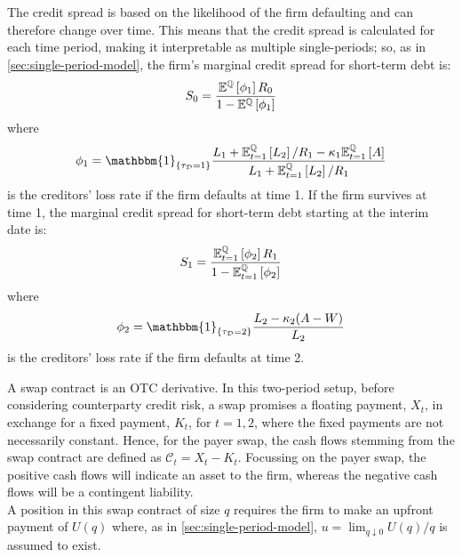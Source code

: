 \documentclass[main.tex]{subfiles}
\begin{document}
        The credit spread is based on the likelihood of the firm defaulting and can therefore change over time.
        This means that the credit spread is calculated for each time period, making it interpretable as multiple single-periods;
        so, as in \cref{sec:single-period-model}, the firm's marginal credit spread for short-term debt is:
        \begin{equation}
            S_0 =
            \frac{
                \mathbb{E}^{\mathbb{Q}}\left[\phi_1\right]R_0
            }{
                1 - \mathbb{E}^{\mathbb{Q}}\left[\phi_1\right] 
            }
        \end{equation}
        where
        \begin{equation}
        \phi_1 = \mathbbm{1}_{\{\tau_{\mathcal{D}}=1\}}
        \frac{L_{1}+\mathbb{E}_{t=1}^{\rnmeasure}\left[L_{2}\right]/R_1 - \kappa_{1}\mathbb{E}_{t=1}^{\rnmeasure}\left[A\right]}
        {L_{1} + \mathbb{E}_{t=1}^{\rnmeasure}\left[L_{2}\right]/R_1}
        \end{equation}
        is the creditors' loss rate if the firm defaults at time 1. If the firm survives at time 1, the marginal credit spread for short-term debt starting at the interim date is:
        \begin{equation}
            S_1 =
            \frac{
                \mathbb{E}_{t=1}^{\mathbb{Q}}\left[\phi_2\right]R_1
            }{
                1 - \mathbb{E}_{t=1}^{\mathbb{Q}}\left[\phi_2\right] 
            }
        \end{equation}
        where
        \begin{equation}
        \phi_2 = \mathbbm{1}_{\{\tau_{\mathcal{D}}=2\}}
        \frac{L_{2}-\kappa_{2}(A-W)}
        {L_{2}}
        \end{equation}
        is the creditors' loss rate if the firm defaults at time 2.

        A swap contract is an OTC derivative.
        In this two-period setup, before considering counterparty credit risk, a swap promises a floating payment, $X_t$, in exchange for a fixed payment, $K_t$, for $t = 1,2$, where the fixed payments are not necessarily constant.
        Hence, for the payer swap, the cash flows stemming from the swap contract are defined as $\mathcal{C}_t = X_t - K_t$.
        Focussing on the payer swap, the positive cash flows will indicate an asset to the firm, whereas the negative cash flows will be a contingent liability.
        \\
        A position in this swap contract of size $q$ requires the firm to make an upfront payment of $U(q)$ where, as in \cref{sec:single-period-model}, $u = \lim_{q \downarrow 0} U(q)/q$ is assumed to exist.
\end{document}
